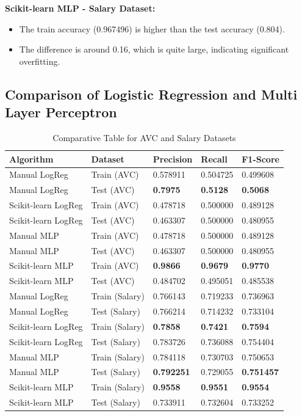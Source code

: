 \documentclass[a4paper,12pt]{article}
\begin{document}
\textbf{Scikit-learn MLP - Salary Dataset:}
\begin{itemize}
    \item The train accuracy (0.967496) is higher than the test accuracy (0.804).
    \item The difference is around 0.16, which is quite large, indicating significant overfitting.
\end{itemize}


\subsection{Comparison of Logistic Regression and Multi Layer Perceptron}

\begin{table}[h!]
    \centering
    \caption{Comparative Table for AVC and Salary Datasets}
    \begin{tabularx}{\textwidth}{|l|l|X|X|X|}
    \hline
    \textbf{Algorithm} & \textbf{Dataset} & \textbf{Precision} & \textbf{Recall} & \textbf{F1-Score} \\
    \hline
    Manual LogReg & Train (AVC) & 0.578911 & 0.504725 & 0.499608 \\
    Manual LogReg & Test (AVC) & \textbf{0.7975} & \textbf{0.5128} & \textbf{0.5068} \\
    Scikit-learn LogReg & Train (AVC) & 0.478718 & 0.500000 & 0.489128 \\
    Scikit-learn LogReg & Test (AVC) & 0.463307 & 0.500000 & 0.480955 \\
    Manual MLP & Train (AVC) & 0.478718 & 0.500000 & 0.489128 \\
    Manual MLP & Test (AVC) & 0.463307 & 0.500000 & 0.480955 \\
    Scikit-learn MLP & Train (AVC) & \textbf{0.9866} & \textbf{0.9679} & \textbf{0.9770} \\
    Scikit-learn MLP & Test (AVC) & 0.484702 & 0.495051 & 0.485538 \\
    \hline
    Manual LogReg & Train (Salary) & 0.766143 & 0.719233 & 0.736963 \\
    Manual LogReg & Test (Salary) & 0.766214 & 0.714232 & 0.733104 \\
    Scikit-learn LogReg & Train (Salary) & \textbf{0.7858} & \textbf{0.7421} & \textbf{0.7594} \\
    Scikit-learn LogReg & Test (Salary) & 0.783726 & 0.736088 & 0.754404 \\
    Manual MLP & Train (Salary) & 0.784118 & 0.730703 & 0.750653 \\
    Manual MLP & Test (Salary) & \textbf{0.792251} & 0.729055 & \textbf{0.751457} \\
    Scikit-learn MLP & Train (Salary) & \textbf{0.9558} & \textbf{0.9551} & \textbf{0.9554} \\
    Scikit-learn MLP & Test (Salary) & 0.733911 & 0.732604 & 0.733252 \\
    \hline
    \end{tabularx}
\end{table}
\end{document}
